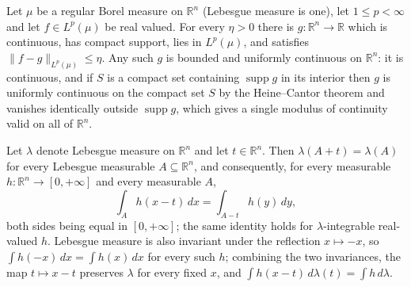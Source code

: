 \begin{proposition}
Let $\mu$ be a regular Borel measure on $\mathbb{R}^n$ (Lebesgue measure is
one), let $1 \leq p < \infty$ and let $f \in L^p(\mu)$ be real valued.  For
every $\eta > 0$ there is $g : \mathbb{R}^n \to \mathbb{R}$ which is
continuous, has compact support, lies in $L^p(\mu)$, and satisfies
$\|f - g\|_{L^p(\mu)} \leq \eta$.  Any such $g$ is bounded and uniformly
continuous on $\mathbb{R}^n$: it is continuous, and if $S$ is a compact set
containing $\operatorname{supp} g$ in its interior then $g$ is uniformly
continuous on the compact set $S$ by the Heine--Cantor theorem and vanishes
identically outside $\operatorname{supp} g$, which gives a single modulus of
continuity valid on all of $\mathbb{R}^n$.
\end{proposition}
\begin{proposition}
Let $\lambda$ denote Lebesgue measure on $\mathbb{R}^n$ and let
$t \in \mathbb{R}^n$.  Then $\lambda(A + t) = \lambda(A)$ for every Lebesgue
measurable $A \subseteq \mathbb{R}^n$, and consequently, for every measurable
$h : \mathbb{R}^n \to [0,+\infty]$ and every measurable $A$,
\[
  \int_A h(x-t)\, dx = \int_{A-t} h(y)\, dy ,
\]
both sides being equal in $[0,+\infty]$; the same identity holds for
$\lambda$-integrable real-valued $h$.  Lebesgue measure is also invariant under
the reflection $x \mapsto -x$, so $\int h(-x)\,dx = \int h(x)\,dx$ for every
such $h$; combining the two invariances, the map $t \mapsto x - t$ preserves
$\lambda$ for every fixed $x$, and $\int h(x-t)\,d\lambda(t) = \int h\,d\lambda$.
\end{proposition}
